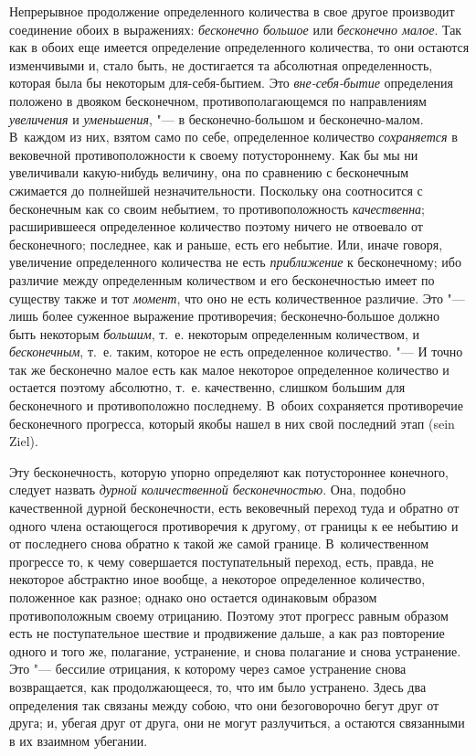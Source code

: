 Непрерывное продолжение определенного количества в свое другое производит
соединение обоих в выражениях: {\em бесконечно большое}
или {\em бесконечно малое}. Так как в обоих еще имеется
определение определенного количества, то они остаются изменчивыми и, стало
быть, не достигается та абсолютная определенность, которая была бы
некоторым для-себя-бытием. Это {\em вне-себя-бытие}
определения положено в двояком бесконечном, противополагающемся по
направлениям {\em увеличения} и
{\em уменьшения}, "--- в бесконечно-большом и
бесконечно-малом. В~каждом из них, взятом само по себе, определенное
количество {\em сохраняется} в вековечной
противоположности к своему потустороннему. Как бы мы ни увеличивали
какую-нибудь величину, она по сравнению с бесконечным сжимается до
полнейшей незначительности. Поскольку она соотносится с бесконечным как со
своим небытием, то противоположность {\em качественна};
расширившееся определенное количество поэтому ничего не отвоевало от
бесконечного; последнее, как и раньше, есть его небытие. Или, иначе говоря,
увеличение определенного количества не есть
{\em приближение} к бесконечному; ибо различие между
определенным количеством и его бесконечностью имеет по существу также и тот
{\em момент}, что оно не есть количественное различие.
Это "--- лишь более суженное выражение противоречия; бесконечно-большое должно
быть некоторым {\em большим}, т.~е. некоторым
определенным количеством, и {\em бесконечным}, т.~е.
таким, которое не есть определенное количество. "--- И точно так же бесконечно
малое есть как малое некоторое определенное количество и остается поэтому
абсолютно, т.~е. качественно, слишком большим для бесконечного и
противоположно последнему. В~обоих сохраняется противоречие бесконечного
прогресса, который якобы нашел в них свой последний этап (sein Ziel).

Эту бесконечность, которую упорно определяют как потустороннее конечного,
следует назвать {\em дурной количественной
бесконечностью}. Она, подобно качественной дурной бесконечности, есть
вековечный переход туда и обратно от одного члена остающегося противоречия
к другому, от границы к ее небытию и от последнего снова обратно к такой же
самой границе. В~количественном прогрессе то, к чему совершается
поступательный переход, есть, правда, не некоторое абстрактно иное
вообще, а некоторое определенное количество, положенное как разное; однако
оно остается одинаковым образом противоположным своему отрицанию. Поэтому
этот прогресс равным образом есть не поступательное шествие и продвижение
дальше, а как раз повторение одного и того же, полагание, устранение, и
снова полагание и снова устранение. Это "--- бессилие отрицания, к которому
через самое устранение снова возвращается, как продолжающееся, то, что им
было устранено. Здесь два определения так связаны между собою, что они
безоговорочно бегут друг от друга; и, убегая друг от друга, они не могут
разлучиться, а остаются связанными в их взаимном убегании.


